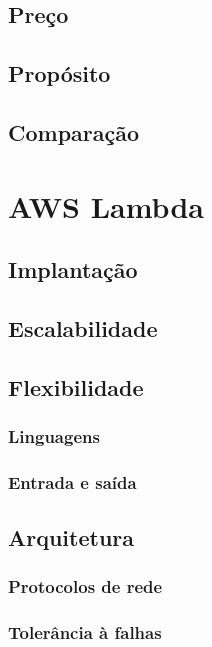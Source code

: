 \subsection{Preço}

\subsection{Propósito}

\subsection{Comparação}

\section{AWS Lambda}

\subsection{Implantação}

\subsection{Escalabilidade}

\subsection{Flexibilidade}

\subsubsection{Linguagens}
\subsubsection{Entrada e saída}

\subsection{Arquitetura}

\subsubsection{Protocolos de rede}

\subsubsection{Tolerância à falhas}

